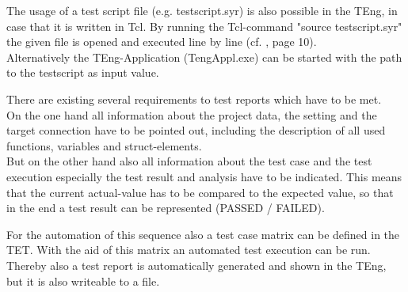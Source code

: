 







The usage of a test script file (e.g. testscript.syr) is also possible in the TEng, in case that it is written in Tcl. By running the Tcl-command "source testscript.syr" the given file is opened and executed line by line (cf. \cite{testbooktwo}, page 10).
\\
Alternatively the TEng-Application (TengAppl.exe) can be started with the path to the testscript as input value.








There are existing several requirements to test reports which have to be met.
\\
On the one hand all information about the project data, the setting and the target connection have to be pointed out, including the description of all used functions, variables and struct-elements.
\\
But on the other hand also all information about the test case and the test execution especially the test result and analysis have to be indicated. This means that the current actual-value has to be compared to the expected value, so that in the end a test result can be represented (PASSED / FAILED).








For the automation of this sequence also a test case matrix can be defined in the TET. With the aid of this matrix an automated test execution can be run. Thereby also a test report is automatically generated and shown in the TEng, but it is also writeable to a file.

















